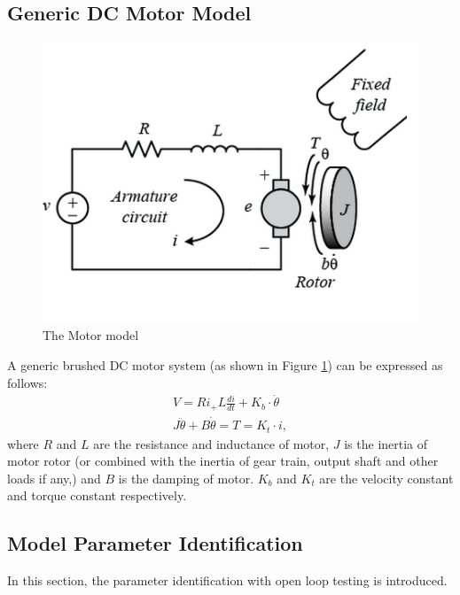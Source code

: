 \documentclass{article}
\begin{document}
\subsection{Generic DC Motor Model}
\begin{figure}[h!]
\centering
\includegraphics[scale=0.6]{Motor.png}
\caption{The Motor model \cite{MotorFig} }
\label{fig:Motor_Model}
\end{figure}
A generic brushed DC motor system (as shown in Figure \ref{fig:Motor_Model}) can be expressed as follows:
\begin{align}
\label{eqn:Electro}
V=Ri_+L\frac{di}{dt}+K_b\cdot \dot{\theta}\\
\label{eqn:Mechanics}
J\ddot{\theta}+B\dot{\theta}=T=K_t\cdot i,
\end{align}
where $R$ and $L$ are the resistance and inductance of motor, $J$ is the inertia of motor rotor (or combined with the inertia of gear train, output shaft and other loads if any,) and $B$ is the damping of motor. $K_b$ and $K_t$ are the velocity constant and torque constant respectively.

\subsection{Model Parameter Identification}
In this section, the parameter identification with open loop testing is introduced.
\end{document}
